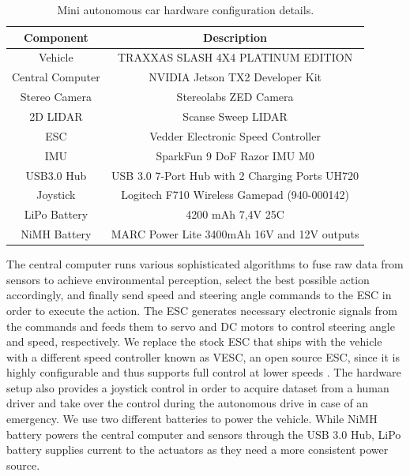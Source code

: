 \begin{table}[h]
  \begin{center}
    \caption[Hardware configuration]{Mini autonomous car hardware configuration
      details.}
    \label{table:hardware-configuration}
    \begin{tabular}{|c|c|}
      \hline
      \textbf{Component} & \textbf{Description} \\
      \hline
      Vehicle            & TRAXXAS SLASH 4X4 PLATINUM EDITION \\ 
      \hline
      Central Computer   & NVIDIA Jetson TX2 Developer Kit \\
      \hline
      Stereo Camera      & Stereolabs ZED Camera \\
      \hline
      2D LIDAR           & Scanse Sweep LIDAR \\
      \hline
      ESC                & Vedder Electronic Speed Controller \\
      \hline
      IMU                & SparkFun 9 DoF Razor IMU M0 \\
      \hline
      USB3.0 Hub         & USB 3.0 7-Port Hub with 2 Charging Ports UH720 \\
      \hline
      Joystick           & Logitech F710 Wireless Gamepad (940-000142) \\
      \hline
      LiPo Battery       & 4200 mAh 7,4V 25C \\
      \hline
      NiMH Battery       & MARC Power Lite 3400mAh 16V and 12V outputs \\
      \hline
    \end{tabular}
  \end{center}
\end{table}

The central computer runs various sophisticated algorithms to fuse raw data
from sensors to achieve environmental perception, select the best possible
action accordingly, and finally send speed and steering angle commands to the
ESC in order to execute the action. The ESC generates necessary electronic
signals from the commands and feeds them to servo and DC motors to control
steering angle and speed, respectively. We replace the stock ESC that ships
with the vehicle with a different speed controller known as VESC, an open
source ESC, since it is highly configurable and thus supports full control at
lower speeds \cite{Vesc2015ESC}. The hardware setup also provides a joystick
control in order to acquire dataset from a human driver and take over the
control during the autonomous drive in case of an emergency. We use two
different batteries to power the vehicle. While NiMH battery powers the
central computer and sensors through the USB 3.0 Hub, LiPo battery supplies
current to the actuators as they need a more consistent power source.

